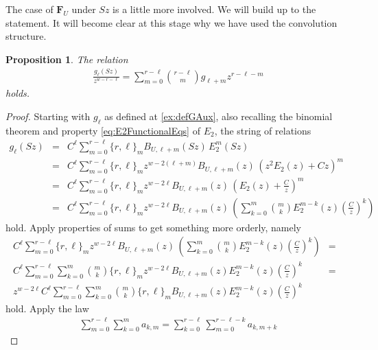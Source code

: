 \documentclass[11pt]{article}
\newtheorem{prop}{Proposition}
\begin{document}
The case of $ \mathbf{F}_U $ under $ Sz $ is a little more involved. We will build up to the statement.  It will become clear at this stage why we have used the convolution structure. 
    \begin{prop}\label{prop:gUnderS}
        The relation 
            \begin{eqnarray*}
                \frac{g_\ell(Sz)}{z^{w-r-\ell}} = \sum_{m=0}^{r-\ell}\binom{r-\ell}{m}g_{\ell+m}z^{r-\ell - m}
            \end{eqnarray*}
        holds.
    \end{prop}
    \begin{proof}
        Starting with $ g_\ell $ as defined at \eqref{ex:defGAux}, also recalling the binomial theorem and property \eqref{eq:E2FunctionalEqs} of $ E_2 $, the string of relations
            \begin{eqnarray*}
                g_\ell(Sz) &=& C^\ell \sum_{m=0}^{r-\ell} \{r,\ell\}_m B_{U, \ell + m}(Sz)\,E_2^m(Sz) \\
                &=& C^\ell \sum_{m=0}^{r-\ell} \{r,\ell\}_m z^{w-2(\ell+m)}B_{U, \ell + m}(z)\,(z^2E_2(z) + Cz)^m \\
                &=& C^\ell \sum_{m=0}^{r-\ell} \{r,\ell\}_m z^{w-2\ell}B_{U, \ell + m}(z)\,\left(E_2(z) + \frac{C}{z} \right)^m \\
                &=& C^\ell \sum_{m=0}^{r-\ell} \{r,\ell\}_m z^{w-2\ell}B_{U, \ell + m}(z)\,\left(\sum^m_{k=0}\binom{m}{k}E_2^{m-k}(z)\left( \frac{C}{z}\right)^{k} \right)
            \end{eqnarray*}
        hold. Apply properties of sums to get something more orderly, namely
            \begin{eqnarray*}
                C^\ell \sum_{m=0}^{r-\ell} \{r,\ell\}_m z^{w-2\ell}B_{U, \ell + m}(z)\,\left(\sum^m_{k=0}\binom{m}{k}E_2^{m-k}(z)\left( \frac{C}{z}\right)^{k} \right) &=& \\ 
                C^\ell \sum_{m=0}^{r-\ell}\sum^m_{k=0} \binom{m}{k}\{r,\ell\}_m z^{w-2\ell}B_{U, \ell + m}(z)E_2^{m-k}(z) \left( \frac{C}{z}\right)^{k} &=& \\
                z^{w-2\ell} {C^\ell}\sum_{m=0}^{r-\ell}\sum^m_{k=0} \binom{m}{k}\{r,\ell\}_m B_{U, \ell + m}(z)E_2^{m-k}(z) \left( \frac{C}{z}\right)^{k} 
            \end{eqnarray*}
        hold. Apply the law 
            \begin{eqnarray*}
                \sum_{m=0}^{r-\ell} \sum_{k=0}^{m}a_{k,m} = \sum_{k=0}^{r-\ell} \sum_{m=0}^{r-\ell -k}a_{k, m+k}

\end{eqnarray*}
\end{proof}
\end{document}
